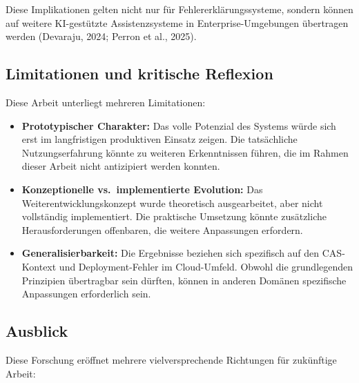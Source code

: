\documentclass[
  a4paper,
  12pt,
  oneside,
  open=any,
  BCOR=12mm,
  DIV=14,
  parskip=half*,
  headsepline,
  footsepline,
  pointlessnumbers,
  liststotoc,
  numbers=noenddot,
  listof=totoc]{scrartcl}
\providecommand{\tightlist}{%
  \setlength{\itemsep}{0pt}\setlength{\parskip}{0pt}}\usepackage{longtable,booktabs,array}
\begin{document}
Diese Implikationen gelten nicht nur für Fehlererklärungssysteme,
sondern können auf weitere KI-gestützte Assistenzsysteme in
Enterprise-Umgebungen übertragen werden (Devaraju, 2024; Perron et al.,
2025).

\subsection{Limitationen und kritische
Reflexion}\label{limitationen-und-kritische-reflexion}

Diese Arbeit unterliegt mehreren Limitationen:

\begin{itemize}
\tightlist
\item
  \textbf{Prototypischer Charakter:} Das volle Potenzial des Systems
  würde sich erst im langfristigen produktiven Einsatz zeigen. Die
  tatsächliche Nutzungserfahrung könnte zu weiteren Erkenntnissen
  führen, die im Rahmen dieser Arbeit nicht antizipiert werden konnten.
\item
  \textbf{Konzeptionelle vs.~implementierte Evolution:} Das
  Weiterentwicklungskonzept wurde theoretisch ausgearbeitet, aber nicht
  vollständig implementiert. Die praktische Umsetzung könnte zusätzliche
  Herausforderungen offenbaren, die weitere Anpassungen erfordern.
\item
  \textbf{Generalisierbarkeit:} Die Ergebnisse beziehen sich spezifisch
  auf den CAS-Kontext und Deployment-Fehler im Cloud-Umfeld. Obwohl die
  grundlegenden Prinzipien übertragbar sein dürften, können in anderen
  Domänen spezifische Anpassungen erforderlich sein.
\end{itemize}

\subsection{Ausblick}\label{ausblick}

Diese Forschung eröffnet mehrere vielversprechende Richtungen für
zukünftige Arbeit:
\end{document}
